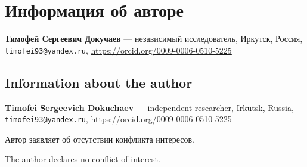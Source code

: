 \documentclass[11pt,a4paper]{article}
\theoremstyle{plain}
\theoremstyle{remark}
\begin{document}
\section*{Информация об авторе}
\noindent\textbf{Тимофей Сергеевич Докучаев} ---
независимый исследователь, Иркутск, Россия,\\
\texttt{timofei93@yandex.ru}, \url{https://orcid.org/0009-0006-0510-5225}

\begin{otherlanguage}{english}
\section*{Information about the author}
\noindent\textbf{Timofei Sergeevich Dokuchaev} ---
independent researcher, Irkutsk, Russia,\\
\texttt{timofei93@yandex.ru}, \url{https://orcid.org/0009-0006-0510-5225}
\end{otherlanguage}

\medskip
\noindent Автор заявляет об отсутствии конфликта интересов.

\begin{otherlanguage}{english}
\noindent The author declares no conflict of interest.
\end{otherlanguage}
\end{document}
